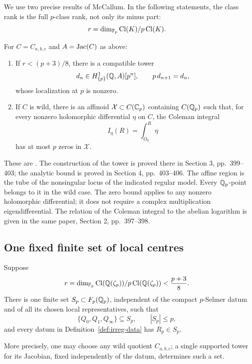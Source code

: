 We use two precise results of McCallum. In the following statements,
the class rank is the full \(p\)-class rank, not only its minus part:
\[
 r=\dim_{\mathbb F_p}\operatorname{Cl}(K)/p\operatorname{Cl}(K).
\]

\begin{proposition}[McCallum]\label{prop:irreg-McCallum}
For \(C=C_{a,b,c}\) and \(A=\operatorname{Jac}(C)\) as above:
\begin{enumerate}
\item If \(r<(p+3)/8\), there is a compatible tower
\[
 d_n\in H^1_{\{p\}}(\mathbb Q,A)[p^n],\qquad p\,d_{n+1}=d_n,
\]
whose localization at \(p\) is nonzero.
\item If \(C\) is wild, there is an affinoid
\(\mathcal X\subset C(\mathbb C_p)\) containing \(C(\mathbb Q_p)\) such that,
for every nonzero holomorphic differential \(\eta\) on \(C\),
the Coleman integral
\[
 I_\eta(R)=\int_{O_0}^R\eta
\]
has at most \(p\) zeros in \(\mathcal X\).
\end{enumerate}
\end{proposition}

These are \cite[Propositions 2 and 3, pp.~397--398]{McCallum2001Brauer}.
The construction of the tower is proved there in Section 3,
pp.~399--403; the analytic bound is proved in Section 4,
pp.~403--406. The affine region is the tube of the nonsingular
locus of the indicated regular model. Every \(\mathbb Q_p\)-point belongs
to it in the wild case. The zero bound applies to any nonzero
holomorphic differential; it does not require a complex
multiplication eigendifferential. The relation of the Coleman
integral to the abelian logarithm is given in the same paper,
Section 2, pp.~397--398.

\subsection{One fixed finite set of local centres}
\label{sec:irreg-fixed}

\begin{theorem}\label{thm:irreg-fixed}
Suppose
\begin{equation}
 r=\dim_{\mathbb F_p}\operatorname{Cl}(\mathbb Q(\zeta_p))/p\operatorname{Cl}(\mathbb Q(\zeta_p))
       <\frac{p+3}{8}.
 \label{eq:irreg-Mc-bound}
\end{equation}
There is one finite set \(S_p\subset F_p(\mathbb Q_p)\), independent of
the compact \(p\)-Selmer datum and of all its chosen local
representatives, such that
\begin{equation}
 \{Q_0,Q_1,Q_\infty\}\subseteq S_p,\qquad
 |S_p|\leq p,
 \label{eq:irreg-fixed-size}
\end{equation}
and every datum in Definition~\ref{def:irreg-data} has
\(R_p\in S_p\).

More precisely, one may choose any wild quotient \(C_{a,b,c}\);
a single supported tower for its Jacobian, fixed independently of
the datum, determines such a set.
\end{theorem}

